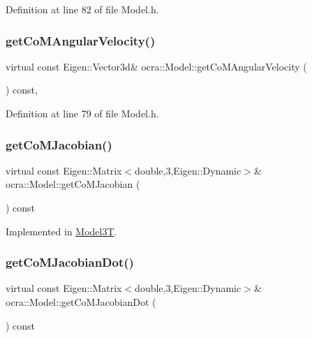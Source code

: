 Definition at line 82 of file Model.\+h.

\hypertarget{classocra_1_1Model_ac7f7c87ee1ecb19e342faaac8241de6c}{}\label{classocra_1_1Model_ac7f7c87ee1ecb19e342faaac8241de6c} 
\subsubsection{\texorpdfstring{get\+Co\+M\+Angular\+Velocity()}{getCoMAngularVelocity()}}
{\footnotesize\ttfamily virtual const Eigen\+::\+Vector3d\& ocra\+::\+Model\+::get\+Co\+M\+Angular\+Velocity (\begin{DoxyParamCaption}{ }\end{DoxyParamCaption}) const\hspace{0.3cm}{\ttfamily [inline]}, {\ttfamily [virtual]}}



Definition at line 79 of file Model.\+h.

\hypertarget{classocra_1_1Model_a4b148504194036b0faafe619e5b98f59}{}\label{classocra_1_1Model_a4b148504194036b0faafe619e5b98f59} 
\subsubsection{\texorpdfstring{get\+Co\+M\+Jacobian()}{getCoMJacobian()}}
{\footnotesize\ttfamily virtual const Eigen\+::\+Matrix$<$double,3,Eigen\+::\+Dynamic$>$\& ocra\+::\+Model\+::get\+Co\+M\+Jacobian (\begin{DoxyParamCaption}{ }\end{DoxyParamCaption}) const\hspace{0.3cm}{\ttfamily [pure virtual]}}



Implemented in \hyperlink{classModel3T_addc6149d27f7cb5d3c8ab453e55b88e4}{Model3T}.

\hypertarget{classocra_1_1Model_abfc71fa0f52145b1df92bdbd0963c926}{}\label{classocra_1_1Model_abfc71fa0f52145b1df92bdbd0963c926} 
\subsubsection{\texorpdfstring{get\+Co\+M\+Jacobian\+Dot()}{getCoMJacobianDot()}}
{\footnotesize\ttfamily virtual const Eigen\+::\+Matrix$<$double,3,Eigen\+::\+Dynamic$>$\& ocra\+::\+Model\+::get\+Co\+M\+Jacobian\+Dot (\begin{DoxyParamCaption}{ }\end{DoxyParamCaption}) const\hspace{0.3cm}{\ttfamily [pure virtual]}}



